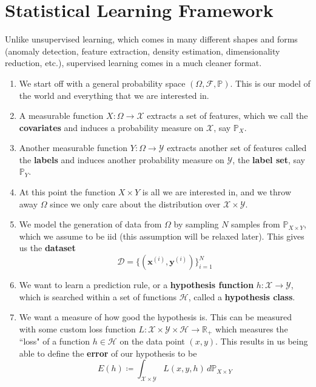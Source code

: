\documentclass{article}
\theoremstyle{definition}
\begin{document}
\section{Statistical Learning Framework}

  Unlike unsupervised learning, which comes in many different shapes and forms (anomaly detection, feature extraction, density estimation, dimensionality reduction, etc.), supervised learning comes in a much cleaner format. 
  \begin{enumerate}
    \item We start off with a general probability space $(\Omega, \mathcal{F}, \mathbb{P})$. This is our model of the world and everything that we are interested in. 

    \item A measurable function $X: \Omega \rightarrow \mathcal{X}$ extracts a set of features, which we call the \textbf{covariates} and induces a probability measure on $\mathcal{X}$, say $\mathbb{P}_X$. 

    \item Another measurable function $Y: \Omega \rightarrow \mathcal{Y}$ extracts another set of features called the \textbf{labels} and induces another probability measure on $\mathcal{Y}$, the \textbf{label set}, say $\mathbb{P}_Y$. 

    \item At this point the function $X \times Y$ is all we are interested in, and we throw away $\Omega$ since we only care about the distribution over $\mathcal{X} \times \mathcal{Y}$. 

    \item We model the generation of data from $\Omega$ by sampling $N$ samples from $\mathbb{P}_{X \times Y}$, which we assume to be iid (this assumption will be relaxed later). This gives us the \textbf{dataset} 
      \[\mathcal{D} = \{(\mathbf{x}^{(i)}, \mathbf{y}^{(i)}) \}_{i=1}^N\]

    \item We want to learn a prediction rule, or a \textbf{hypothesis function} $h: \mathcal{X} \rightarrow \mathcal{Y}$, which is searched within a set of functions $\mathcal{H}$, called a \textbf{hypothesis class}. 

    \item We want a measure of how good the hypothesis is. This can be measured with some custom loss function $L: \mathcal{X} \times \mathcal{Y} \times \mathcal{H} \rightarrow \mathbb{R}_+$ which measures the ``loss" of a function $h \in \mathcal{H}$ on the data point $(x, y)$. This results in us being able to define the \textbf{error} of our hypothesis to be 
      \[E(h) \coloneqq \int_{\mathcal{X} \times \mathcal{Y}} L (x, y, h) \,d\mathbb{P}_{X \times Y}\]
  \end{enumerate}
\end{document}
